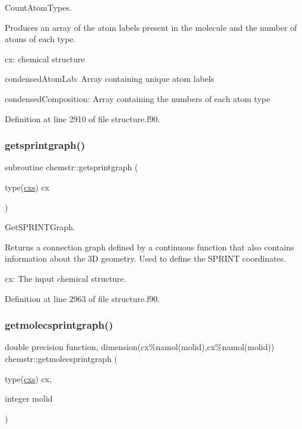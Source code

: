 Count\+Atom\+Types. 

Produces an array of the atom labels present in the molecule and the number of atoms of each type.


\begin{DoxyItemize}
\item cx\+: chemical structure
\item condensed\+Atom\+Lab\+: Array containing unique atom labels
\item condensed\+Composition\+: Array containing the numbers of each atom type 
\end{DoxyItemize}

Definition at line 2910 of file structure.\+f90.

\mbox{\label{namespacechemstr_aa95cf9277a2a7cc615ac876e1d8d3753}} 
\subsubsection{\texorpdfstring{getsprintgraph()}{getsprintgraph()}}
{\footnotesize\ttfamily subroutine chemstr\+::getsprintgraph (\begin{DoxyParamCaption}\item[{type(\mbox{\hyperlink{structchemstr_1_1cxs}{cxs}})}]{cx }\end{DoxyParamCaption})}



Get\+S\+P\+R\+I\+N\+T\+Graph. 

Returns a connection graph defined by a continuous function that also contains information about the 3D geometry. Used to define the S\+P\+R\+I\+NT coordinates.


\begin{DoxyItemize}
\item cx\+: The input chemical structure. 
\end{DoxyItemize}

Definition at line 2963 of file structure.\+f90.

\mbox{\label{namespacechemstr_aef2c3947de661cdb93febb1e495a5551}} 
\subsubsection{\texorpdfstring{getmolecsprintgraph()}{getmolecsprintgraph()}}
{\footnotesize\ttfamily double precision function, dimension(cx\%namol(molid),cx\%namol(molid)) chemstr\+::getmolecsprintgraph (\begin{DoxyParamCaption}\item[{type(\mbox{\hyperlink{structchemstr_1_1cxs}{cxs}})}]{cx,  }\item[{integer}]{molid }\end{DoxyParamCaption})}



